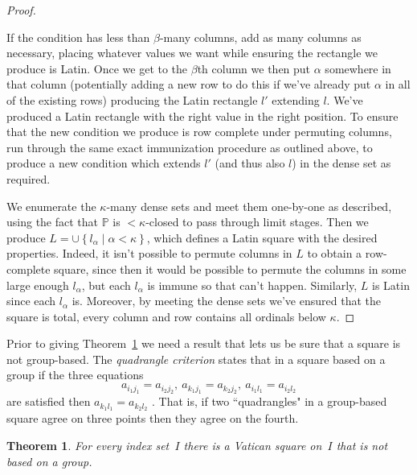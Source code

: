 \documentclass[12pt,a4paper]{article}
\newtheorem{thm}{Theorem}[section]
\newcommand{\st}{\; | \;}
\newcommand{\set}[2]{\left\{#1\st #2 \right\}}
\renewcommand{\P}{\mathbb{P}}
\begin{document}
\begin{proof}
\begin{enumerate}
		If the condition has less than $\beta$-many columns, add as many columns as necessary, placing whatever values we want while ensuring the rectangle we produce is Latin. Once we get to the $\beta$th column we then put $\alpha$ somewhere in that column (potentially adding a new row to do this if we've already put $\alpha$ in all of the existing rows) producing the Latin rectangle $l'$ extending $l$. We've produced a Latin rectangle with the right value in the right position. 
To ensure that the new condition we produce is row complete under permuting columns, run through the same exact immunization procedure as outlined above, to produce a new condition which extends $l'$ (and thus also $l$) in the dense set as required.
\end{enumerate}

We enumerate the $\kappa$-many dense sets and meet them one-by-one as described, using the fact that $\P$ is $<\kappa$-closed to pass through limit stages. Then we produce $L=\cup \set{l_\alpha}{\alpha<\kappa}$, which defines a Latin square with the desired properties. Indeed, it isn't possible to permute columns in $L$ to obtain a row-complete square, since then it would be possible to permute the columns in some large enough $l_\alpha$, but each $l_\alpha$ is immune so that can't happen. Similarly, $L$ is Latin since each $l_\alpha$ is. Moreover, by meeting the dense sets we've ensured that the square is total, every column and row contains all ordinals below $\kappa$.
\end{proof}



Prior to giving Theorem~\ref{th:infvat} we need a result that lets us be sure that a square is not group-based.  The {\em quadrangle criterion} states that in a square based on a group if the three equations
$$a_{i_1j_1} = a_{i_2j_2}, \ a_{k_1j_1} = a_{k_2j_2}, \ a_{i_1l_1} = a_{i_2l_2}$$
are satisfied then $a_{k_1l_1} = a_{k_2l_2}$ \cite[Theorem~1.2.1]{DK15}.  That is, if two ``quadrangles" in a group-based square agree on three points then they agree on the fourth.


\begin{thm}\label{th:infvat}
For every index set~$I$ there is a Vatican square on~$I$ that is not based on a  group.
\end{thm}
\end{document}
